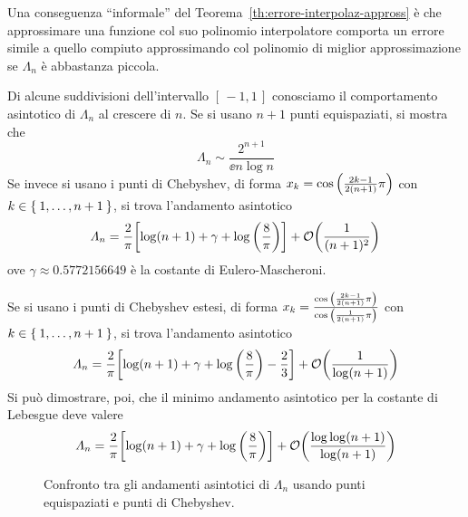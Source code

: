 	Una conseguenza “informale” del Teorema~\ref{th:errore-interpolaz-appross} è che approssimare una funzione col suo polinomio interpolatore comporta un errore simile a quello compiuto approssimando col polinomio di miglior approssimazione se \(\varLambda_n\) è abbastanza piccola.
	
	\begin{esempio}
		Di alcune suddivisioni dell'intervallo \([\, -1, 1 \,]\) conosciamo il comportamento asintotico di \(\varLambda_n\) al crescere di \(n\). Se si usano \(n + 1\) punti equispaziati, si mostra che
		\begin{equation*}
			\varLambda_n \sim \frac{2^{n + 1}}{\ee n \log n}
		\end{equation*}
		Se invece si usano i punti di Chebyshev, di forma \(x_k = \cos \qty(\frac{2 k - 1}{2 (n + 1)} \pi)\) con \(k \in \Set{1, \dots, n + 1}\), si trova l'andamento asintotico
		\begin{equation*}
			\varLambda_n = \frac{2}{\pi} \qty[\log (n + 1) + \gamma + \log \qty(\frac{8}{\pi})] + \mathcal{O} \qty(\frac{1}{(n + 1)^2})
		\end{equation*}
		ove \(\gamma \approx \num{0.5772156649}\) è la costante di Eulero-Mascheroni.
		
		Se si usano i punti di Chebyshev estesi, di forma \(x_k = \frac{\cos \qty(\frac{2 k - 1}{2 (n + 1)} \pi)}{\cos \qty(\frac{1}{2 (n + 1)} \pi)}\) con \(k \in \Set{1, \dots, n + 1}\), si trova l'andamento asintotico
		\begin{equation*}
			\varLambda_n = \frac{2}{\pi} \qty[\log (n + 1) + \gamma + \log \qty(\frac{8}{\pi}) - \frac{2}{3}] + \mathcal{O} \qty(\frac{1}{\log(n + 1)})
		\end{equation*}
		Si può dimostrare, poi, che il minimo andamento asintotico per la costante di Lebesgue deve valere
		\begin{equation*}
			\varLambda_n = \frac{2}{\pi} \qty[\log (n + 1) + \gamma + \log \qty(\frac{8}{\pi})] + \mathcal{O} \qty(\frac{\log \log (n + 1)}{\log (n + 1)})
		\end{equation*}
	\end{esempio}

	\begin{figure}[tpb]
		\centering
		
		
		\caption{Confronto tra gli andamenti asintotici di \(\varLambda_n\) usando punti equispaziati e punti di Chebyshev.}\label{fig:lebesgue-equisp-cheb}
	\end{figure}
